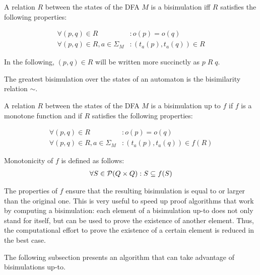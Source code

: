 \begin{definition}
    A relation $R$ between the states of the DFA $M$ is a bisimulation
    iff $R$ satisfies the following properties:

    \begin{align}
        \forall (p, q) \in R&: o(p) = o(q) \\
        \forall (p, q) \in R, a \in \Sigma_M&: (t_a(p), t_a(q)) \in R
    \end{align}

    In the following, $(p, q) \in R$ will be written more succinctly as $p\;R\;q$.
\end{definition}

\begin{definition}
    The greatest bisimulation over the states of an automaton is the bisimilarity relation $\sim$.
\end{definition}

%
%

\begin{definition}
    A relation $R$ between the states of the DFA $M$ is a bisimulation up to $f$
    if $f$ is a monotone function and if $R$ satisfies the following properties:

    \begin{align}
        \forall (p, q) \in R&: o(p) = o(q) \\
        \forall (p, q) \in R, a \in \Sigma_M&: (t_a(p), t_a(q)) \in f(R)
    \end{align}

    Monotonicity of $f$ is defined as follows:
    \begin{align}
        \forall S \in \mathcal{P}(Q \times Q): S \subseteq f(S)
    \end{align}
\end{definition}

The properties of $f$ ensure that the resulting bisimulation
is equal to or larger than the original one.
This is very useful to speed up proof algorithms that work by computing a bisimulation:
each element of a bisimulation up-to does not only stand for itself,
but can be used to prove the existence of another element.
Thus, the computational effort to prove the existence of a certain element
is reduced in the best case.

The following subsection presents an algorithm that can take advantage of bisimulations up-to.
